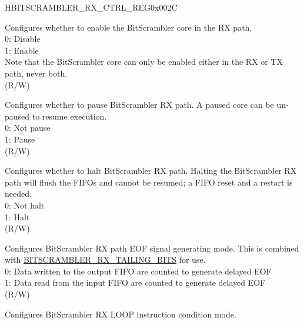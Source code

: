 \begin{register}{H}{BITSCRAMBLER\_RX\_CTRL\_REG}{0x002C}\label{regdesc:BITSCRAMBLERRXCTRLREG}
%
%
%
%
%
%
%
%
%
%
\regnewline%
\begin{regdesc}\begin{reglist}
\label{fielddesc:BITSCRAMBLERRXENA}\item [BITSCRAMBLER\_RX\_ENA] Configures whether to enable the BitScrambler core in the RX path.  \\
0: Disable\\
1: Enable\\
Note that the BitScrambler core can only be enabled either in the RX or TX path, never both.\\
(R/W)
\label{fielddesc:BITSCRAMBLERRXPAUSE}\item [BITSCRAMBLER\_RX\_PAUSE] Configures whether to pause BitScrambler RX path. A paused core can be un-paused to resume execution.\\
0: Not pause\\
1: Pause\\
(R/W)
\label{fielddesc:BITSCRAMBLERRXHALT}\item [BITSCRAMBLER\_RX\_HALT] Configures whether to halt BitScrambler RX path. Halting the BitScrambler RX path will flush the FIFOs and cannot be resumed; a FIFO reset and a restart is needed.\\
0: Not halt\\
1: Halt\\
(R/W)
\label{fielddesc:BITSCRAMBLERRXEOFMODE}\item [BITSCRAMBLER\_RX\_EOF\_MODE] Configures BitScrambler RX path EOF signal generating mode. This is combined with \hyperref[fielddesc:BITSCRAMBLERRXTAILINGBITS]{BITSCRAMBLER\_RX\_TAILING\_BITS} for use.\\
0: Data written to the output FIFO are counted to generate delayed EOF \\
1: Data read from the input FIFO are counted to generate delayed EOF\\
(R/W)
\label{fielddesc:BITSCRAMBLERRXCONDMODE}\item [BITSCRAMBLER\_RX\_COND\_MODE] Configures BitScrambler RX LOOP instruction condition mode.\\

\end{reglist}
\end{regdesc}
\end{register}
